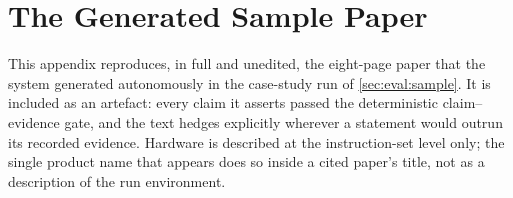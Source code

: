 \section{The Generated Sample Paper}\label{appendix:samplepaper}

This appendix reproduces, in full and unedited, the eight-page paper
that the system generated autonomously in the case-study run of
\cref{sec:eval:sample}. It is included as an artefact: every claim it
asserts passed the deterministic claim--evidence gate, and the text
hedges explicitly wherever a statement would outrun its recorded
evidence. Hardware is described at the instruction-set level only; the
single product name that appears does so inside a cited paper's title,
not as a description of the run environment.


